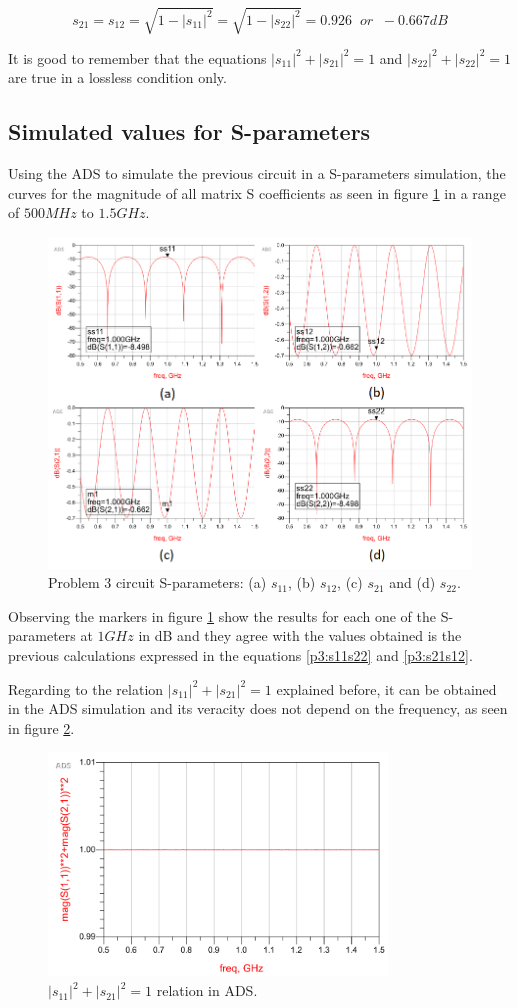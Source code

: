 \begin{equation} \label{p3:s21s12}
    s_{21} = s_{12} = \sqrt{1-|s_{11}|^2} = \sqrt{1-|s_{22}|^2} = 0.926 \; \; or \; \; -0.667 dB 
\end{equation}

It is good to remember that the equations $|s_{11}|^2 + |s_{21}|^2 = 1$ and $|s_{22}|^2 + |s_{22}|^2 = 1$ are true in a lossless condition only.

\subsection{Simulated values for S-parameters}

Using the ADS to simulate the previous circuit in a S-parameters simulation, the curves for the magnitude of all matrix S coefficients as seen in figure \ref{p3:sparams} in a range of $500 MHz$ to $1.5 GHz$.

\begin{figure}[H] 
\centering
\includegraphics[width=15cm]{images/sparamsp3.png}
\caption{Problem 3 circuit S-parameters: (a) $s_{11}$, (b) $s_{12}$, (c) $s_{21}$ and (d) $s_{22}$.}
\label{p3:sparams} 
\end{figure}

Observing the markers in figure \ref{p3:sparams} show the results for each one of the S-parameters at $1GHz$ in dB and they agree with the values obtained is the previous calculations expressed in the equations \ref{p3:s11s22} and \ref{p3:s21s12}.

Regarding to the relation $|s_{11}|^2 + |s_{21}|^2 = 1$ explained before, it can be obtained in the ADS simulation and its veracity does not depend on the frequency, as seen in figure \ref{p3:unit}.

\begin{figure}[H] 
\centering
\includegraphics[width=9cm]{images/unit.png}
\caption{$|s_{11}|^2 + |s_{21}|^2 = 1$ relation in ADS.}
\label{p3:unit} 
\end{figure}
